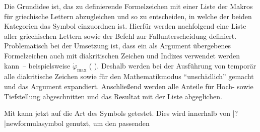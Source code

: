 \documentclass[%
  english,ngerman,%
  cdgeometry=no,DIV=12,%
  cd=false,cdfont=false,cdtitle=true,%
  headings=normal,%
  automark,%
  listof=toc,%
]{tudscrartcl}
\begin{document}
Die Grundidee ist, das zu definierende Formelzeichen mit einer Liste der Makros 
für griechische Lettern abzugleichen und so zu entscheiden, in welche der 
beiden Kategorien das Symbol einzuordnen ist. Hierfür werden nachfolgend eine 
Liste  aller griechischen Lettern sowie der Befehl 
zur Fallunterscheidung definiert. Problematisch bei der Umsetzung ist, dass ein 
als Argument übergebenes Formelzeichen auch mit diakritischen Zeichen und 
Indizes verwendet werden kann~-- beispielsweise $\dot{\varphi}_{\mathrm{max}}$
(%
  \PValue{\textunderscore}%
). Deshalb werden bei der Ausführung von  temporär alle 
diakritische Zeichen sowie  für den Mathematikmodus 
\enquote{unschädlich} gemacht und das Argument  expandiert. 
Anschließend werden alle Anteile für Hoch- sowie Tiefstellung abgeschnitten und 
das Resultat mit der Liste  abgeglichen.
%
\CodeHook{\let\newcommand\renewcommand}
\begin{Hint*}
\makeatletter
\newcommand*\greeksymbollist{}
\def\@tempa#1{\ifdefvoid{#1}{}{\listadd\greeksymbollist{#1}}}
\forcsvlist{\@tempa}{%
  \alpha,\beta,\varbeta,\gamma,\delta,\epsilon,\varepsilon,\zeta,%
  \eta,\theta,\vartheta,\iota,\kappa,\varkappa,\lambda,\mu,\nu,%
  \xi,\omicron,\pi,\varpi,\rho,\varrho,\sigma,\varsigma,\tau,%
  \upsilon,\phi,\varphi,\chi,\psi,\omega,%
  \Alpha,\Beta,\Gamma,\Delta,\Epsilon,\Zeta,\Eta,\Theta,\Iota,%
  \Kappa,\Lambda,\Mu,\Nu,\Xi,\Omicron,\Pi,\Rho,\Sigma,\Tau,\Upsilon,%
  \Phi,\Chi,\Psi,\Omega%
}
\newcommand*\ifisgreeksymbol[1]{%
  \begingroup%
    \def\@tempa##1{\let##1\@firstofone}%
    \forcsvlist{\@tempa}{%
      \acute,\bar,\breve,\check,\dot,\ddot,\dddot,\ddddot,%
      \hat,\widehat,\grave,\tilde,\widetilde,\vec,%
      \Acute,\Bar,\Breve,\Check,\Dot,\Ddot,\Hat,\Grave,\Tilde,\Vec%
    }%
    \def\boldsymbol{}%
    \protected@edef\@tempa{#1}%
    \def\@tempb##1_##2\relax{\def\@tempa{##1}}%
    \expandafter\@tempb\@tempa_\relax\relax%
    \def\@tempb##1^##2\relax{\def\@tempa{##1}}%
    \expandafter\@tempb\@tempa^\relax\relax%
    \expandafter\ifinlist\expandafter{\@tempa}{\greeksymbollist}{%
      \aftergroup\@firstoftwo%
    }{%
      \aftergroup\@secondoftwo%
    }%
  \endgroup%
}
\makeatother
\end{Hint*}
%
Mit  kann jetzt auf die Art des Symbols getestet. Dies 
wird innerhalb von \Macro|?|{newformulasymbol} genutzt, um den passenden 
\end{document}
